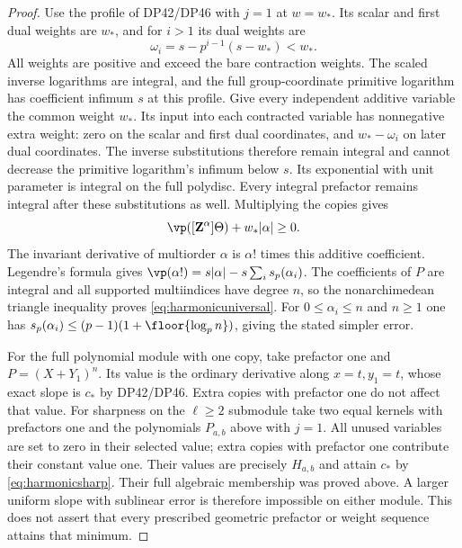 \begin{proof}
Use the profile of DP42/DP46 with $j=1$ at $w=w_*$.
Its scalar and first dual weights are $w_*$, and for $i>1$ its dual weights are
\[
 \omega_i=s-p^{i-1}(s-w_*)<w_*.
\]
All weights are positive and exceed the bare contraction weights.
The scaled inverse logarithms are integral, and the full group-coordinate primitive logarithm has coefficient infimum $s$ at this profile.
Give every independent additive variable the common weight $w_*$.
Its input into each contracted variable has nonnegative extra weight: zero on the scalar and first dual coordinates, and $w_*-\omega_i$ on later dual coordinates.
The inverse substitutions therefore remain integral and cannot decrease the primitive logarithm's infimum below $s$.
Its exponential with unit parameter is integral on the full polydisc.
Every integral prefactor remains integral after these substitutions as well.
Multiplying the copies gives
\[
 \vp([\mathbf Z^\alpha]\Theta)+w_*|\alpha|\ge0.
\]
The invariant derivative of multiorder $\alpha$ is $\alpha!$ times this additive coefficient.
Legendre's formula gives
$\vp(\alpha!)=s|\alpha|-s\sum_i s_p(\alpha_i)$.
The coefficients of $P$ are integral and all supported multiindices have degree $n$, so the nonarchimedean triangle inequality proves \eqref{eq:harmonicuniversal}.
For $0\le\alpha_i\le n$ and $n\ge1$ one has
$s_p(\alpha_i)\le(p-1)(1+\floor{\log_p n})$, giving the stated simpler error.

For the full polynomial module with one copy, take prefactor one and $P=(X+Y_1)^n$.
Its value is the ordinary derivative along $x=t,y_1=t$, whose exact slope is $c_*$ by DP42/DP46.
Extra copies with prefactor one do not affect that value.
For sharpness on the $\ell\ge2$  submodule take two equal kernels with prefactors one and the polynomials $P_{a,b}$ above with $j=1$.
All unused variables are set to zero in their selected value; extra copies with prefactor one contribute their constant value one.
Their values are precisely $H_{a,b}$ and attain $c_*$ by \eqref{eq:harmonicsharp}.
Their full algebraic  membership was proved above.
A larger uniform slope with sublinear error is therefore impossible on either module.
This does not assert that every prescribed geometric prefactor or weight sequence attains that minimum.
\end{proof}